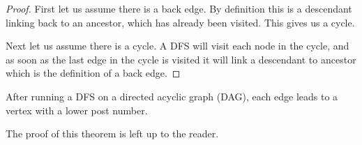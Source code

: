 \begin{proof}

First let us assume there is a back edge.  By definition this is a
descendant linking back to an ancestor, which has already been
visited.  This gives us a cycle.

Next let us assume there is a cycle.  A DFS will visit each node in
the cycle, and as soon as the last edge in the cycle is visited it
will link a descendant to ancestor which is the definition of a back
edge.

\end{proof}

\begin{theorem}

After running a DFS on a directed acyclic graph (DAG), each edge leads
to a vertex with a lower post number.

\end{theorem}

The proof of this theorem is left up to the reader.
